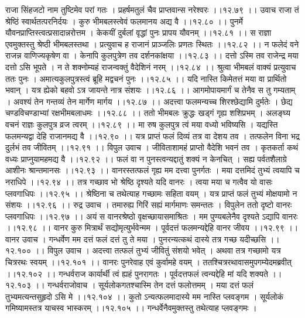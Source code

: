 \documentclass[11pt]{book}
\begin{document}
\begin{landscape}
राजा सिंहजटो नाम तुष्टिमेव परां गतः ।
प्रहर्षमतुलं चैव प्राप्तवान्स नरेश्वरः ।।१२.७९ ।।
उवाच राजा तं श्रेष्ठिं स्वार्थतत्परनिर्दयः ।
कुरु भीमबलस्त्वेवं फलमानय अद्य वै ।।१२.८० ।।
पुनर्मे यौवनप्राप्तिस्त्वत्प्रसादान्नरोत्तम ।
केकयीं दुर्बलां वृद्धां पुनः प्रापय यौवनम् ।।१२.८१ ।।
स राज्ञा एवमुक्तस्तु श्रेष्ठी भीमबलस्तथा ।
प्रत्युवाच ह राजानं प्राञ्जलिः प्रणतः स्थितः ।।१२.८२ ।।
न फलेदं वने राजन्न वाणिज्यकृषेण वा ।
केनापि कुलपुत्रेण तव दर्शनकांक्षया ।।१२.८३ ।।
दत्तो ऽस्मि तव राजेन्द्र मया दत्तो ऽसि भूपते ।
न ते शक्नोम्यहं राजन्वक्तुं वैदेशिनं नरम् ।।१२.८४ ।।
श्रुत्वा भीमबलं वाक्यं प्रत्युवाच ततः पुनः ।
अमात्यकुलपुत्रस्त्वं ब्रूहि मद्वचनं पुनः ।।१२.८५ ।।
यदि नास्ति किमेतत्तं मया वा प्रार्थितो भवान् ।
यत्र ह्येको बहवो ऽत्र जायन्ते नात्र संशयः ।।१२.८६ ।।
आगमोपायमार्गं च तेनैव स तु गम्यताम् ।
अवश्यं तेन गन्तव्यं तेन मार्गेण मार्गय ।।१२.८७ ।।
अदत्त्वा फलमन्यच्च शिरश्छेद्यामि दुर्मतेः ।
छेद्य चण्डविचण्डाभ्यां रक्षभीमबलाधमः ।।१२.८८ ।।
ततो भीमबलः क्रुद्धः खड्गं गृह्य शशिप्रभम् ।
अलङ्घ्य वचनं राज्ञः कुलपुत्र व्रज त्वरम् ।।१२.८९ ।।
मा रुष कुलपुत्र त्वं मया वध्यो भविष्यसि ।
यद्यस्ति फलमन्यद्वा देहि राजानमद्य वै ।।१२.९० ।।
यत्र प्राप्तं फलं दिव्यं तत्र वा देशय तव ।
तत्फलेन विना भद्र दुर्लभं तव जीवितम् ।।१२.९१ ।।
विपुल उवाच ।
जीविताशामहं प्राप्तो वैदेशि भवनं तव ।
कृतकर्ता कथं वध्यः प्राप्नुयामहमद्य वै ।।१२.९२ ।।
फलं वा न पुनस्त्वन्यद्दातुं शक्यं न केनचित् ।
सह्य पर्वतशैलाग्रे आशीनः श्रान्तमानसः ।।१२.९३ ।।
वानरस्तत्फलं गृह्य मम दत्त्वा पुनर्गतः ।
मया दत्तमिदं तुभ्यं त्वयापि च नराधिपे ।।१२.९४ ।।
तत्र गच्छाव भो श्रेष्ठि दृश्यते यदि वानरः ।
त्वया मया च गत्वैव यो वासः प्लवगाधिपः ।।१२.९५ ।।
श्रेष्ठिना च तथेत्याह गच्छामः सहिता वयम् ।
यत्र प्राप्तं फलं तुभ्यं मोक्षयामो न संशयः ।।१२.९६ ।।
रुद्र उवाच ।
तमारुह्य गिरिं सह्यं मार्गमाणः समन्ततः ।
विपुलेन ततो दृष्टो वानरः प्लवगाधिपः ।।१२.९७ ।।
अयं स वानरश्रेष्ठो वृक्षच्छायासमाश्रितः ।
मम पुण्यबलेनैव दृश्यते ऽद्यापि वानरः ।।१२.९८ ।।
वानर कुरु मित्रार्थं सद्योमृत्युर्भवेन्मम ।
पूर्वदत्तं फलमन्यद्देहि वानर जीवय ।।१२.९९ ।।
वानर उवाच ।
गन्धर्वेण मम दत्तं फलं दत्तं तु ते मया ।
पुनरन्यत्कथं दास्ये तत्र गच्छ यदीच्छसि ।।१२.१०० ।।
विपुल उवाच ।
अदत्त्वा तत्फलं तुभ्यं जीवितुं संशयो भवेत् ।
अथवा तत्र गच्छामो यत्र चित्ररथः स्वयम् ।।१२.१०१ ।।
वानरः पुनरेवाह एवं कुर्वामहे वयम् ।
ततश्चित्ररथावासमुपगम्येदमब्रवीत् ।।१२.१०२ ।।
गन्धर्वराज कार्यार्थी त्वं ह्यहं पुनरागतः ।
पूर्वदत्तफलं त्वन्यद्देहि मां यदि शक्यते ।। १२.१०३ ।।
गन्धर्वराजोवाच ।
सूर्यलोकगतश्चास्मि तेन दत्तं फलोत्तमम् ।
मया दत्तं फलं तुभ्यमत्यन्तसुहृदो ऽसि मे ।।१२.१०४ ।।
कुतो ऽन्यत्फलमादास्ये मम नास्ति प्लवङ्गम ।
सूर्यलोकं गमिष्यामस्तत्र याचस्व भास्करम् ।।१२.१०५ ।।
गन्धर्वेनैवमुक्तस्तु तथेत्याह प्लवङ्गमः ।

\end{landscape}
\end{document}
